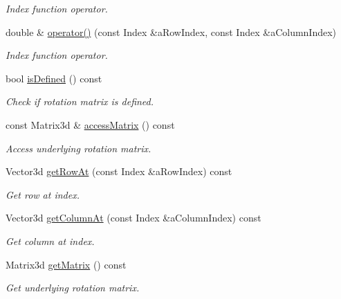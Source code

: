 \begin{DoxyCompactItemize}
\begin{DoxyCompactList}\small\item\em Index function operator. \end{DoxyCompactList}\item 
double \& \hyperlink{classlibrary_1_1math_1_1geom_1_1trf_1_1rot_1_1_rotation_matrix_a09a9da15d503894cf85e47c0b7238a77}{operator()} (const Index \&a\+Row\+Index, const Index \&a\+Column\+Index)
\begin{DoxyCompactList}\small\item\em Index function operator. \end{DoxyCompactList}\item 
bool \hyperlink{classlibrary_1_1math_1_1geom_1_1trf_1_1rot_1_1_rotation_matrix_aa5034776af47fc1eacb77359cef04550}{is\+Defined} () const
\begin{DoxyCompactList}\small\item\em Check if rotation matrix is defined. \end{DoxyCompactList}\item 
const Matrix3d \& \hyperlink{classlibrary_1_1math_1_1geom_1_1trf_1_1rot_1_1_rotation_matrix_a957387a407da1658fa63dc6692254175}{access\+Matrix} () const
\begin{DoxyCompactList}\small\item\em Access underlying rotation matrix. \end{DoxyCompactList}\item 
Vector3d \hyperlink{classlibrary_1_1math_1_1geom_1_1trf_1_1rot_1_1_rotation_matrix_a71dca1f50f8073256ff69bb365c3a772}{get\+Row\+At} (const Index \&a\+Row\+Index) const
\begin{DoxyCompactList}\small\item\em Get row at index. \end{DoxyCompactList}\item 
Vector3d \hyperlink{classlibrary_1_1math_1_1geom_1_1trf_1_1rot_1_1_rotation_matrix_a637e10366c51b6e2137b1454522c5c07}{get\+Column\+At} (const Index \&a\+Column\+Index) const
\begin{DoxyCompactList}\small\item\em Get column at index. \end{DoxyCompactList}\item 
Matrix3d \hyperlink{classlibrary_1_1math_1_1geom_1_1trf_1_1rot_1_1_rotation_matrix_a34bb5fed2819a1b6f446ecc7ddf7ffd3}{get\+Matrix} () const
\begin{DoxyCompactList}\small\item\em Get underlying rotation matrix. \end{DoxyCompactList}\item 

\end{DoxyCompactItemize}
